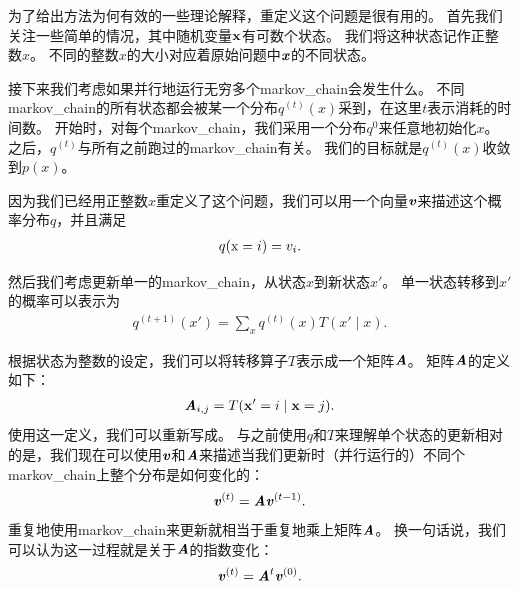 为了给出方法为何有效的一些理论解释，重定义这个问题是很有用的。  %
首先我们关注一些简单的情况，其中随机变量$\mathbf{x}$有可数个状态。
我们将这种状态记作正整数$x$。
不同的整数$x$的大小对应着原始问题中$\boldsymbol{\mathit{x}}$的不同状态。


接下来我们考虑如果并行地运行无穷多个\gls{markov_chain}会发生什么。   %
不同\gls{markov_chain}的所有状态都会被某一个分布$q^{(t)}(x)$采到，在这里$t$表示消耗的时间数。  %
开始时，对每个\gls{markov_chain}，我们采用一个分布$q^{{0}}$来任意地初始化$x$。  
之后，$q^{(t)}$与所有之前跑过的\gls{markov_chain}有关。 %
我们的目标就是$q^{(t)}(x)$收敛到$p(x)$。  %


因为我们已经用正整数$x$重定义了这个问题，我们可以用一个向量$\boldsymbol{\mathit{v}}$来描述这个概率分布$q$，并且满足   %
\begin{align}
q(\mathrm{x} = i) = v_i.
\end{align}


然后我们考虑更新单一的\gls{markov_chain}，从状态$x$到新状态$x'$。
单一状态转移到$x'$的概率可以表示为
\begin{align}
\label{eqn:transition1}
q^{(t+1)}(x') = \sum_{x} q^{(t)}(x) T(x'\mid x).
\end{align}


根据状态为整数的设定，我们可以将转移算子$T$表示成一个矩阵$\boldsymbol{\mathit{A}}$。
矩阵$\boldsymbol{\mathit{A}}$的定义如下：
\begin{align}
\boldsymbol{\mathit{A}}_{i,j} = T(\mathbf{x}' = i\mid \mathbf{x} = j).
\end{align}
使用这一定义，我们可以重新写成。  %
与之前使用$q$和$T$来理解单个状态的更新相对的是，我们现在可以使用$\boldsymbol{\mathit{v}}$和$\boldsymbol{\mathit{A}}$来描述当我们更新时（并行运行的）不同个\gls{markov_chain}上整个分布是如何变化的：   %
\begin{align}
\boldsymbol{\mathit{v}}^{(t)} = \boldsymbol{\mathit{A}} \boldsymbol{\mathit{v}}^{(t-1)}.
\end{align}
重复地使用\gls{markov_chain}来更新就相当于重复地乘上矩阵$\boldsymbol{\mathit{A}}$。  %
换一句话说，我们可以认为这一过程就是关于$\boldsymbol{\mathit{A}}$的指数变化：   %
\begin{align}
\boldsymbol{\mathit{v}}^{(t)} = \boldsymbol{\mathit{A}}^{t} \boldsymbol{\mathit{v}}^{(0)}.
\end{align}



